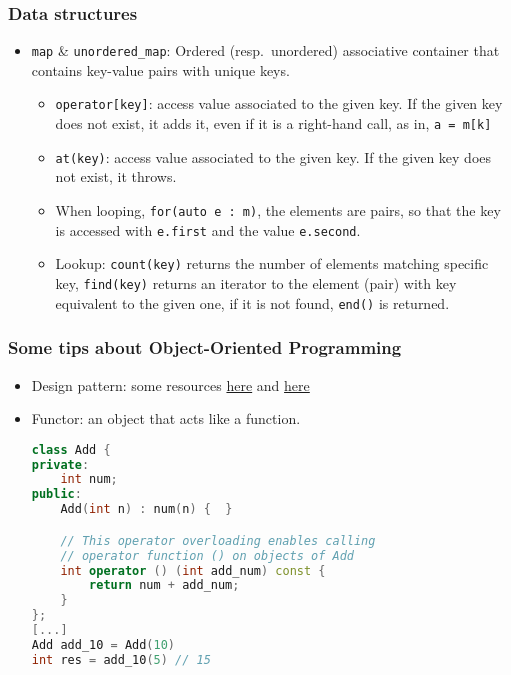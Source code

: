\documentclass[a4paper,12pt,%
              final%
              ]{article}
\begin{document}
\subsubsection{Data structures}
\begin{itemize}
  \item \verb|map| \& \verb|unordered_map|: Ordered (resp.~unordered) associative container that contains key-value pairs with unique keys.
    \begin{itemize}
      \item \verb|operator[key]|: access value associated to the given key. If the given key does not exist, it adds it, even if it is a right-hand call, as in, \verb|a = m[k]|
      \item \verb|at(key)|: access value associated to the given key. If the given key does not exist, it throws.
      \item When looping, \verb|for(auto e : m)|, the elements are pairs, so that the key is accessed with \verb|e.first| and the value \verb|e.second|.
      \item Lookup: \verb|count(key)| returns the number of elements matching specific key, \verb|find(key)| returns an iterator to the element (pair) with key equivalent to the given one, if it is not found, \verb|end()| is returned.
    \end{itemize}
\end{itemize}

\subsubsection{Some tips about Object-Oriented Programming}
\begin{itemize}
  \item Design pattern: some resources \href{https://www.tutorialspoint.com/design_pattern/design_pattern_overview.htm}{here} and \href{https://sourcemaking.com/design_patterns}{here}
  \item Functor: an object that acts like a function.
    \begin{lstlisting}[language=C++]
class Add {
private:
    int num;
public:
    Add(int n) : num(n) {  }

    // This operator overloading enables calling
    // operator function () on objects of Add
    int operator () (int add_num) const {
        return num + add_num;
    }
};
[...]
Add add_10 = Add(10)
int res = add_10(5) // 15
    \end{lstlisting}
\end{itemize}
\end{document}
